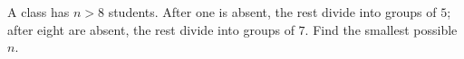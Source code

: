 A class has $n>8$ students. After one is absent, the rest divide into groups of $5$; after eight are absent, the rest divide into groups of $7$. Find the smallest possible $n$.
